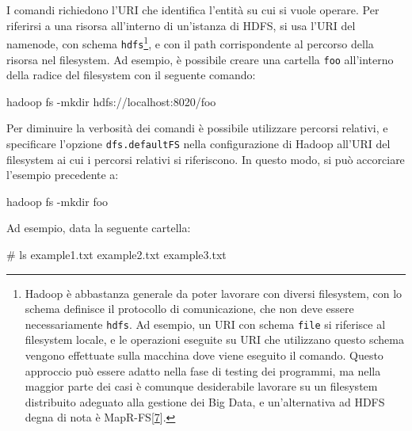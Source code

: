 \documentclass[italian,a4paper, twoside, 12pt]{report}
\newenvironment{Shaded}{}{}
\newcommand{\ExtensionTok}[1]{#1}
\newcommand{\NormalTok}[1]{#1}
\begin{document}
I comandi richiedono l'URI che identifica l'entità su cui si vuole
operare. Per riferirsi a una risorsa all'interno di un'istanza di HDFS,
si usa l'URI del namenode, con schema \texttt{hdfs}\footnote{Hadoop è
  abbastanza generale da poter lavorare con diversi filesystem, con lo
  schema definisce il protocollo di comunicazione, che non deve essere
  necessariamente \texttt{hdfs}. Ad esempio, un URI con schema
  \texttt{file} si riferisce al filesystem locale, e le operazioni
  eseguite su URI che utilizzano questo schema vengono effettuate sulla
  macchina dove viene eseguito il comando. Questo approccio può essere
  adatto nella fase di testing dei programmi, ma nella maggior parte dei
  casi è comunque desiderabile lavorare su un filesystem distribuito
  adeguato alla gestione dei Big Data, e un'alternativa ad HDFS degna di
  nota è MapR-FS{[}\protect\hyperlink{ref-mapr-fs}{7}{]}.}, e con il
path corrispondente al percorso della risorsa nel filesystem. Ad
esempio, è possibile creare una cartella \texttt{foo} all'interno della
radice del filesystem con il seguente comando:

\begin{Shaded}
\begin{Highlighting}[]
\ExtensionTok{hadoop}\NormalTok{ fs -mkdir hdfs://localhost:8020/foo}
\end{Highlighting}
\end{Shaded}

Per diminuire la verbosità dei comandi è possibile utilizzare percorsi
relativi, e specificare l'opzione \texttt{dfs.defaultFS} nella
configurazione di Hadoop all'URI del filesystem ai cui i percorsi
relativi si riferiscono. In questo modo, si può accorciare l'esempio
precedente a:

\begin{Shaded}
\begin{Highlighting}[]
\ExtensionTok{hadoop}\NormalTok{ fs -mkdir foo}
\end{Highlighting}
\end{Shaded}

Ad esempio, data la seguente cartella:

\begin{Shaded}
\begin{Highlighting}[]
\NormalTok{[}\ExtensionTok{root@sandbox}\NormalTok{ example_data]# ls}
\ExtensionTok{example1.txt}\NormalTok{  example2.txt  example3.txt}
\end{Highlighting}
\end{Shaded}
\end{document}
